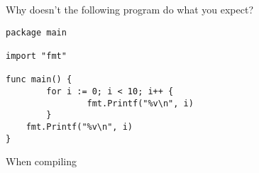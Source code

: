 \begin{Exercise}[title={Scope},difficulty=4]
\label{ex:calc}
\Question\label{ex:scope q1} Why doesn't the following program do
what you expect?

\begin{lstlisting}[caption=Scoping rules]
package main

import "fmt"
                                                                                                   
func main() {
        for i := 0; i < 10; i++ {
                fmt.Printf("%v\n", i)
        }
	fmt.Printf("%v\n", i)
}
\end{lstlisting}

\end{Exercise}

\begin{Answer}
\Question
When compiling


\end{Answer}
